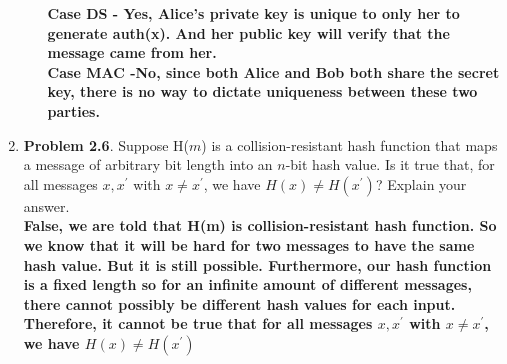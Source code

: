 \documentclass[12pt]{article}
\begin{document}
\begin{enumerate}
\begin{enumerate}
\textbf{Case DS - Yes, Alice's private key is unique to only her to generate auth(x). And her public key will verify that the message came from her.} \\
\textbf{Case MAC -No, since both Alice and Bob both share the secret key, there is no way to dictate uniqueness between these two parties.}
\end{enumerate}
\vspace{40pt}
\item {\textbf{Problem 2.6}. Suppose H($m$) is a collision-resistant hash function that maps a message of arbitrary bit length into an $n$-bit hash value. Is it true that, for all messages $x,x^'$ with $x\neq x^'$, we have $H(x)\neq H(x^')$? Explain your answer.} \\

\textbf{False, we are told that H(m) is collision-resistant hash function. So we know that it will be hard for two messages to have the same hash value. But it is still possible. Furthermore, our hash function is a fixed length so for an infinite amount of different messages, there cannot possibly be different hash values for each input. Therefore, it cannot be true that for all messages $x, x^'$ with $x \neq x^'$, we have $H(x) \neq H(x^')$}

\end{enumerate}
\end{document}
